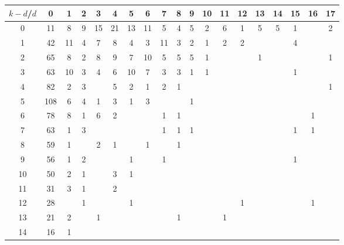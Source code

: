 \documentclass{article}
\begin{document}
\begin{table}[h]\footnotesize
{\centering
\begin{tabular}{|c|c|
c|c|c|c|c|c|c|c|c|c|c|c|c|c|c|c|c|}
  \hline
  $k-d$/$d$ 
 & 0 & 1 & 2 & 3 & 4 & 5 & 6 & 7 & 8 & 9 & 10 & 11 & 12 & 13 & 14 & 15 & 16 & 17\\

  \hline
  \hline

0  & 11 & 8 & 9 & 15 & 21 & 13 & 11 & 5 & 4 & 5 & 2 & 6 & 1 & 5 & 5 & 1 &  & 2\\

1  & 42 & 11 & 4 & 7 & 8 & 4 & 3 & 11 & 3 & 2 & 1 & 2 & 2 &  &  & 4 &  & \\

2  & 65 & 8 & 2 & 8 & 9 & 7 & 10 & 5 & 5 & 5 & 1 &  &  & 1 &  &  &  & 1\\

3  & 63 & 10 & 3 & 4 & 6 & 10 & 7 & 3 & 3 & 1 & 1 &  &  &  &  & 1 &  & \\

4  & 82 & 2 & 3 &  & 5 & 2 & 1 & 2 & 1 &  &  &  &  &  &  &  &  & 1\\

5  & 108 & 6 & 4 & 1 & 3 & 1 & 3 &  &  & 1 &  &  &  &  &  &  &  & \\

6  & 78 & 8 & 1 & 6 & 2 &  &  & 1 & 1 &  &  &  &  &  &  &  & 1 & \\

7  & 63 & 1 & 3 &  &  &  &  & 1 & 1 & 1 &  &  &  &  &  & 1 & 1 & \\

8  & 59 & 1 &  & 2 & 1 &  & 1 &  & 1 &  &  &  &  &  &  &  &  & \\

9  & 56 & 1 & 2 &  &  & 1 &  & 1 &  &  &  &  &  &  &  & 1 &  & \\

10  & 50 & 2 & 1 &  & 3 & 1 &  &  &  &  &  &  &  &  &  &  &  & \\

11  & 31 & 3 & 1 &  & 2 &  &  &  &  &  &  &  &  &  &  &  &  & \\

12  & 28 &  & 1 &  &  & 1 &  &  &  &  &  &  & 1 &  &  &  & 1 & \\

13  & 21 & 2 &  & 1 &  &  &  &  & 1 &  &  & 1 &  &  &  &  &  & \\

14  & 16 & 1 &  &  &  &  &  &  &  &  &  &  &  &  &  &  &  & \\


\end{tabular}}
\end{table}
\end{document}
